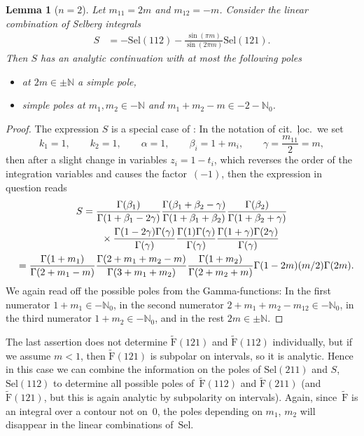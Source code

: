 \documentclass[10pt,a4paper]{amsart}
\numberwithin{equation}{section}
\newtheorem{lem}[teo]{Lemma}
\newcommand{\N}{\mathbb{N}}
\newcommand{\Sel}{\mathrm{Sel}}
\newcommand{\rFp}{\tilde{\mathrm{F}}}
\begin{document}
\begin{lem}[$n=2$]
 	Let $m_{11}=2m$ and $m_{12}=-m$. Consider the linear combination of Selberg integrals
	\begin{align*}
	S&=-\Sel(112)-\frac{\sin(\pi m)}{\sin(2\pi m)}\Sel(121).
	\end{align*}
	Then $S$ has an analytic continuation with at most the following poles
	\begin{itemize}\itemsep=0pt
		\item at $2m\in\pm\N$ a simple pole,
		\item simple poles at $m_1,m_2\in-\N$ and $m_1+m_2-m\in-2-\N_0$.
	\end{itemize}
\end{lem}
\begin{proof}
	The expression $S$ is a special case of \cite[Theorem~1.2]{War09}: In the notation of cit.~ļoc.~we set
\[k_1=1,\qquad k_2=1,\qquad \alpha=1,\qquad \beta_i=1+m_i,\qquad \gamma=\frac{m_{11}}{2}=m,\]
	then after a slight change in variables $z_i=1-t_i$, which reverses the order of the integration variables and causes the factor~$(-1)$, then the expression in question reads
	\begin{gather*}
	S =
	\frac{\Gamma(\beta_1)}{\Gamma(1+\beta_1-2\gamma)}
	\frac{\Gamma(\beta_1+\beta_2-\gamma)}{\Gamma(1+\beta_1+\beta_2)}
	\frac{\Gamma(\beta_2)}{\Gamma(1+\beta_2+\gamma)}\\
\hphantom{S=}{}\times
	\frac{\Gamma(1-2\gamma)\Gamma(\gamma)}{\Gamma(\gamma)}
	\frac{\Gamma(1)\Gamma(\gamma)}{\Gamma(\gamma)}
	\frac{\Gamma(1+\gamma)\Gamma(2\gamma)}{\Gamma(\gamma)}\\
\hphantom{S}{}
=
	\frac{\Gamma(1+m_1)}{\Gamma(2+m_1-m)}
	\frac{\Gamma(2+m_1+m_2-m)}{\Gamma(3+m_1+m_2)}
	\frac{\Gamma(1+m_2)}{\Gamma(2+m_2+m)}
	\Gamma(1-2m)(m/2)\Gamma(2m).
	\end{gather*}
	We again read off the possible poles from the Gamma-functions: In the first numerator $1+m_1\in-\N_0$, in the second numerator $2+m_1+m_2-m_{12}\in-\N_0$, in the third numerator $1+m_2\in-\N_0$, and in the rest $2m\in\pm\N$.
\end{proof}

The last assertion does not determine $\rFp(121)$ and $\rFp(112)$ individually, but if we assume $m<1$, then $\rFp(121)$ is subpolar on intervals, so it is analytic. Hence in this case we can combine the information on the poles of $\Sel(211)$ and $S$, $\Sel(112)$ to determine all possible poles of~$\rFp(112)$ and $\rFp(211)$ (and~$\rFp(121)$, but this is again analytic by subpolarity on intervals). Again, since~$\rFp$ is an integral over a contour not on~$0$, the poles depending on $m_1$, $m_2$ will disappear in the linear combinations of~$\Sel$.
\end{document}
